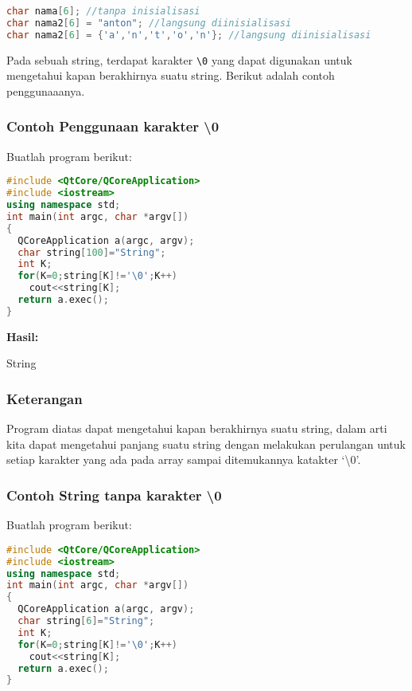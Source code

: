 \begin{lstlisting}[language=c++, numbers=none]
char nama[6]; //tanpa inisialisasi
char nama2[6] = "anton"; //langsung diinisialisasi
char nama2[6] = {'a','n','t','o','n'}; //langsung diinisialisasi
\end{lstlisting}

Pada sebuah string, terdapat karakter \texttt{\textbackslash{}0} yang
dapat digunakan untuk mengetahui kapan berakhirnya suatu string. Berikut
adalah contoh penggunaaanya.

\subsubsection*{Contoh  Penggunaan karakter \textbackslash{0}}

Buatlah program berikut:

\begin{lstlisting}[language=c++, caption=Penggunaan karakter \textbackslash{0}, label=contoh3-15]
#include <QtCore/QCoreApplication>
#include <iostream>
using namespace std;
int main(int argc, char *argv[])
{
  QCoreApplication a(argc, argv);
  char string[100]="String";
  int K;
  for(K=0;string[K]!='\0';K++)
    cout<<string[K];
  return a.exec();
}
\end{lstlisting}

\textbf{Hasil:}

\begin{lcverbatim}
String
\end{lcverbatim}

\subsubsection*{Keterangan}

Program diatas dapat mengetahui kapan berakhirnya suatu string, dalam
arti kita dapat mengetahui panjang suatu string dengan melakukan
perulangan untuk setiap karakter yang ada pada array sampai ditemukannya
katakter `\textbackslash{}0'.

\subsubsection*{Contoh  String tanpa karakter \textbackslash{0}}

Buatlah program berikut:

\begin{lstlisting}[language=c++, caption=String tanpa karakter \textbackslash{0}, label=contoh3-16]
#include <QtCore/QCoreApplication>
#include <iostream>
using namespace std;
int main(int argc, char *argv[])
{
  QCoreApplication a(argc, argv);
  char string[6]="String";
  int K;
  for(K=0;string[K]!='\0';K++)
    cout<<string[K];
  return a.exec();
}
\end{lstlisting}

